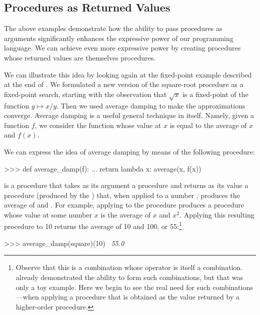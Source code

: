 \subsection{Procedures as Returned Values}
\label{Section 1.3.4}

The above examples demonstrate how the ability to pass procedures as arguments
significantly enhances the expressive power of our programming language.  We
can achieve even more expressive power by creating procedures whose returned
values are themselves procedures.

We can illustrate this idea by looking again at the fixed-point example
described at the end of .  We formulated a new version of
the square-root procedure as a fixed-point search, starting with the
observation that \( \sqrt{x} \) is a fixed-point of the function \( y \mapsto
x / y \).  Then we used average damping to make the approximations converge.
Average damping is a useful general technique in itself.  Namely, given a
function \( f \), we consider the function whose value at \( x \) is equal to the
average of \( x \) and \( f(x) \).

We can express the idea of average damping by means of the following procedure:

\begin{codeBlock}
>>> def average_damp(f):
...     return lambda x: average(x, f(x))
\end{codeBlock}

\noindent
{} is a procedure that takes as its argument a procedure
 and returns as its value a procedure (produced by the )
that, when applied to a number , produces the average of  and
.  For example, applying  to the 
procedure produces a procedure whose value at some number \( x \) is the average
of \( x \) and \( x^2 \).  Applying this resulting procedure to 10 returns the
average of 10 and 100, or 55:\footnote{Observe that this is a combination whose
operator is itself a combination.   already demonstrated the
ability to form such combinations, but that was only a toy example.  Here we
begin to see the real need for such combinations---when applying a procedure
that is obtained as the value returned by a higher-order procedure.}

\begin{codeBlock}
>>> average_damp(square)(10)
~\textit{55.0}~
\end{codeBlock}

